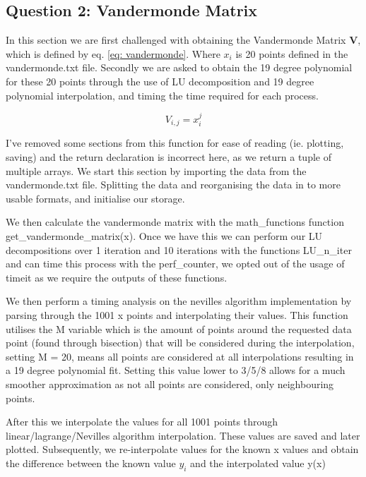 \documentclass{article}
\begin{document}
\subsection*{Question 2: Vandermonde Matrix}
In this section we are first challenged with obtaining the Vandermonde Matrix \textbf{V}, which is defined by eq. \ref{eq: vandermonde}. Where $x_i$ is 20 points defined in the vandermonde.txt file. Secondly we are asked to obtain the 19 degree polynomial for these 20 points through the use of LU decomposition and 19 degree polynomial interpolation, and timing the time required for each process.

\begin{equation}
    V_{i,j} = x_i^j
    \label{eq: vandermonde}
\end{equation}

I've removed some sections from this function for ease of reading (ie. plotting, saving) and the return declaration is incorrect here, as we return a tuple of multiple arrays. We start this section by importing the data from the vandermonde.txt file. Splitting the data and reorganising the data in to more usable formats, and initialise our storage.

We then calculate the vandermonde matrix with the math\_functions function get\_vandermonde\_matrix(x). Once we have this we can perform our LU decompositions over 1 iteration and 10 iterations with the functions LU\_n\_iter and can time this process with the perf\_counter, we opted out of the usage of timeit as we require the outputs of these functions.

We then perform a timing analysis on the nevilles algorithm implementation by parsing through the 1001 x points and interpolating their values. This function utilises the M variable which is the amount of points around the requested data point (found through bisection) that will be considered during the interpolation, setting M = 20, means all points are considered at all interpolations resulting in a 19 degree polynomial fit. Setting this value lower to 3/5/8 allows for a much smoother approximation as not all points are considered, only neighbouring points.

After this we interpolate the values for all 1001 points through linear/lagrange/Nevilles algorithm interpolation. These values are saved and later plotted. Subsequently, we re-interpolate values for the known x values and obtain the difference between the known value $y_i$ and the interpolated value y(x)
\end{document}

